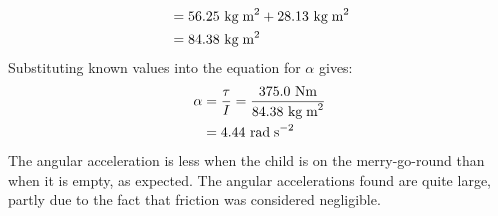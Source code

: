\documentclass[a4paper]{article}
\newcommand\radss{\text{ rad\;s}^{-2}}
\newcommand\Nm{\text{ Nm}}
\newcommand\kgmm{\text{ kg\;m}^{2}}
\begin{document}
\begin{shaded}
\begin{enumerate}
\begin{align*}
            &= 56.25\kgmm + 28.13\kgmm\\
            &= 84.38\kgmm
        \end{align*}
        Substituting known values into the equation for $\alpha$ gives:
        \begin{align*}
            \alpha &= \frac{\tau}{I} = \frac{375.0\Nm}{84.38\kgmm}\\
            &= 4.44\radss
        \end{align*}
        The angular acceleration is less when the child is on the merry-go-round than when it is empty, as expected. The angular accelerations found are quite large, partly due to the fact that friction was considered negligible.
    \end{enumerate}
\end{shaded}
\newpage
\end{document}
